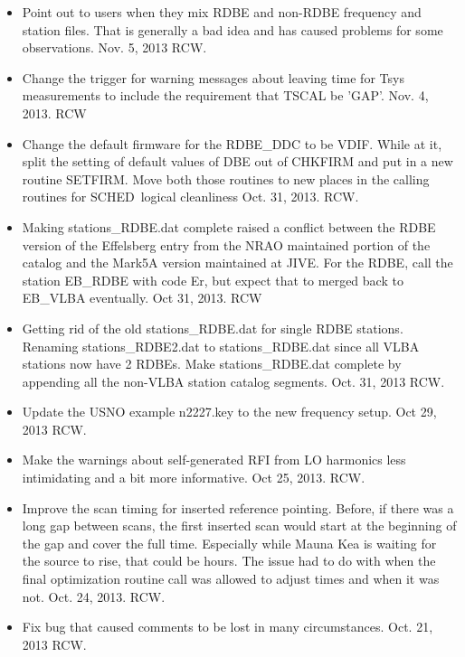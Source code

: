 \documentclass{report}
\newcommand{\schedb}{{\sc SCHED~}}
\begin{document}
\begin{itemize}
\item Point out to users when they mix RDBE and non-RDBE frequency 
and station files.  That is generally a bad idea and has caused 
problems for some observations.  Nov. 5, 2013  RCW.

\item Change the trigger for warning messages about leaving time for
Tsys measurements to include the requirement that TSCAL be 'GAP'.
Nov. 4, 2013. RCW

\item Change the default firmware for the RDBE\_DDC to be VDIF.  While
at it, split the setting of default values of DBE out of CHKFIRM  and
put in a new routine SETFIRM.  Move both those routines to new
places in the calling routines for \schedb logical cleanliness
Oct. 31, 2013.  RCW.

\item Making stations\_RDBE.dat complete raised a conflict between the
RDBE version of the Effelsberg entry from the NRAO maintained portion
of the catalog and the Mark5A version maintained at JIVE.  For the
RDBE, call the station EB\_RDBE with code Er, but expect that to
merged back to EB\_VLBA eventually.  Oct 31, 2013. RCW

\item Getting rid of the old stations\_RDBE.dat for single RDBE
stations.  Renaming stations\_RDBE2.dat to stations\_RDBE.dat since
all VLBA stations now have 2 RDBEs.  Make stations\_RDBE.dat complete
by appending all the non-VLBA station catalog segments.  Oct. 31, 2013
RCW.

\item Update the USNO example n2227.key to the new frequency setup.
Oct 29, 2013  RCW.

\item Make the warnings about self-generated RFI from LO harmonics
less intimidating and a bit more informative.  Oct 25, 2013.  RCW.

\item Improve the scan timing for inserted reference pointing.  Before,
if there was a long gap between scans, the first inserted scan would
start at the beginning of the gap and cover the full time.  Especially
while Mauna Kea is waiting for the source to rise, that could be hours.
The issue had to do with when the final optimization routine call was 
allowed to adjust times and when it was not.  Oct. 24, 2013.  RCW.

\item Fix bug that caused comments to be lost in many circumstances.
Oct. 21, 2013  RCW.


\end{itemize}
\end{document}

